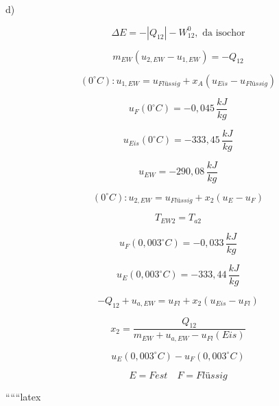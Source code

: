 d)

\[
\Delta E = -|Q_{12}| - W_{12}^0, \text{ da isochor}
\]

\[
m_{EW} (u_{2,EW} - u_{1,EW}) = -Q_{12}
\]

\[
(0^\circ C): u_{1,EW} = u_{Flüssig} + x_{A} (u_{Eis} - u_{Flüssig})
\]

\[
u_{F}(0^\circ C) = -0,045 \, \frac{kJ}{kg}
\]

\[
u_{Eis}(0^\circ C) = -333,45 \, \frac{kJ}{kg}
\]

\[
u_{EW} = -290,08 \, \frac{kJ}{kg}
\]

\[
(0^\circ C): u_{2,EW} = u_{Flüssig} + x_{2} (u_{E} - u_{F})
\]

\[
T_{EW2} = T_{a2}
\]

\[
u_{F}(0,003^\circ C) = -0,033 \, \frac{kJ}{kg}
\]

\[
u_{E}(0,003^\circ C) = -333,44 \, \frac{kJ}{kg}
\]

\[
-Q_{12} + u_{a,EW} = u_{Fl} + x_{2} (u_{Eis} - u_{Fl})
\]

\[
x_{2} = \frac{Q_{12}}{m_{EW} + u_{a,EW} - u_{Fl}(Eis)}
\]

\[
u_{E}(0,003^\circ C) - u_{F}(0,003^\circ C)
\]

\[
E = Fest \quad F = Flüssig
\]

``````latex